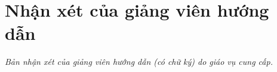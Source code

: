 \chapter*{Nhận xét của giảng viên hướng dẫn}
\label{advisor}

\textit{Bản nhận xét của giảng viên hướng dẫn (có chữ ký) do giáo vụ cung cấp.}

\vfill
